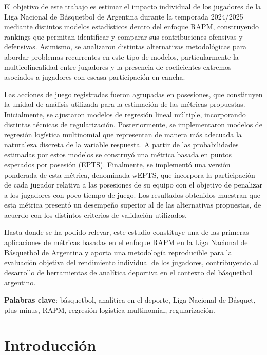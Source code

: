 \documentclass[
  12pt,
]{article}
\renewcommand{\contentsname}{Contenido}
\begin{document}
El objetivo de este trabajo es estimar el impacto individual de los
jugadores de la Liga Nacional de Básquetbol de Argentina durante la
temporada 2024/2025 mediante distintos modelos estadísticos dentro del
enfoque RAPM, construyendo rankings que permitan identificar y comparar
sus contribuciones ofensivas y defensivas. Asimismo, se analizaron
distintas alternativas metodológicas para abordar problemas recurrentes
en este tipo de modelos, particularmente la multicolinealidad entre
jugadores y la presencia de coeficientes extremos asociados a jugadores
con escasa participación en cancha.

Las acciones de juego registradas fueron agrupadas en posesiones, que
constituyen la unidad de análisis utilizada para la estimación de las
métricas propuestas. Inicialmente, se ajustaron modelos de regresión
lineal múltiple, incorporando distintas técnicas de regularización.
Posteriormente, se implementaron modelos de regresión logística
multinomial que representan de manera más adecuada la naturaleza
discreta de la variable respuesta. A partir de las probabilidades
estimadas por estos modelos se construyó una métrica basada en puntos
esperados por posesión (EPTS). Finalmente, se implementó una versión
ponderada de esta métrica, denominada wEPTS, que incorpora la
participación de cada jugador relativa a las posesiones de su equipo con
el objetivo de penalizar a los jugadores con poco tiempo de juego. Los
resultados obtenidos muestran que esta métrica presentó un desempeño
superior al de las alternativas propuestas, de acuerdo con los distintos
criterios de validación utilizados.

Hasta donde se ha podido relevar, este estudio constituye una de las
primeras aplicaciones de métricas basadas en el enfoque RAPM en la Liga
Nacional de Básquetbol de Argentina y aporta una metodología
reproducible para la evaluación objetiva del rendimiento individual de
los jugadores, contribuyendo al desarrollo de herramientas de analítica
deportiva en el contexto del básquetbol argentino.

\textbf{Palabras clave}: básquetbol, analítica en el deporte, Liga
Nacional de Básquet, plus-minus, RAPM, regresión logística multinomial,
regularización.

\newpage
\renewcommand{\contentsname}{Contenido}
\tableofcontents
\newpage
{}
\setcounter{page}{1}

\section{Introducción}\label{introducciuxf3n}
\end{document}
